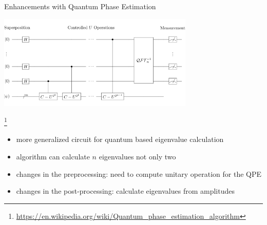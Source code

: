 \begin{frame}{Enhancements with Quantum Phase Estimation}
  \begin{minipage}{1.0\textwidth}
    \centering
    \includegraphics[width=0.7\textwidth]{../assets/wp_phase_estimation.png}
  \end{minipage}
  \footnote{\url{https://en.wikipedia.org/wiki/Quantum_phase_estimation_algorithm}}
  \begin{minipage}{1.0\textwidth}
    \begin{itemize}
      \item more generalized circuit for quantum based eigenvalue calculation
      \item algorithm can calculate $n$ eigenvalues not only two
      \item changes in the preprocessing: need to compute unitary operation for the QPE
      \item changes in the post-processing: calculate eigenvalues from amplitudes
    \end{itemize}
  \end{minipage}
\end{frame}
